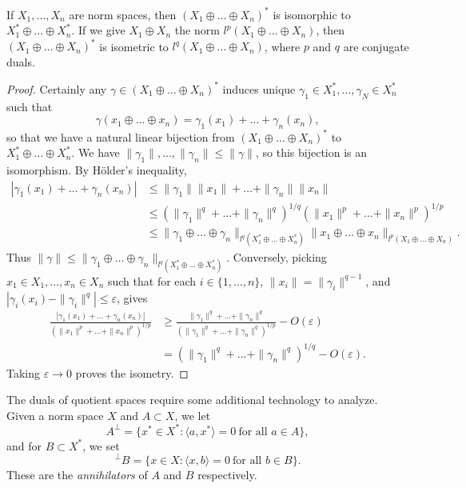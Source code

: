 \begin{theorem}
    If $X_1, \dots, X_n$ are norm spaces, then $(X_1 \oplus \dots \oplus X_n)^*$ is isomorphic to $X_1^* \oplus \dots \oplus X_n^*$. If we give $X_1 \oplus X_n$ the norm $l^p(X_1 \oplus \dots \oplus X_n)$, then $(X_1 \oplus \dots \oplus X_n)^*$ is isometric to $l^q(X_1 \oplus \dots \oplus X_n)$, where $p$ and $q$ are conjugate duals.
\end{theorem}
\begin{proof}
    Certainly any $\gamma \in (X_1 \oplus \dots \oplus X_n)^*$ induces unique $\gamma_1 \in X_1^*, \dots, \gamma_N \in X_n^*$ such that
    \[ \gamma(x_1 \oplus \dots \oplus x_n) = \gamma_1(x_1) + \dots + \gamma_n(x_n), \]
    so that we have a natural linear bijection from $(X_1 \oplus \dots \oplus X_n)^*$ to $X_1^* \oplus \dots \oplus X_n^*$. We have $\| \gamma_1 \|, \dots, \| \gamma_n \| \leq \| \gamma \|$, so this bijection is an isomorphism. By H\"{o}lder's inequality,
    \begin{align*}
        |\gamma_1(x_1) + \dots + \gamma_n(x_n)| &\leq \| \gamma_1 \| \| x_1 \| + \dots + \| \gamma_n \| \| x_n \|\\
        &\leq \left( \| \gamma_1 \|^q + \dots + \| \gamma_n \|^q \right)^{1/q} \left( \| x_1 \|^p + \dots + \| x_n \|^p \right)^{1/p}\\
        &\leq \| \gamma_1 \oplus \dots \oplus \gamma_n \|_{l^q(X_1^* \oplus \dots \oplus X_n^*)} \| x_1 \oplus \dots \oplus x_n \|_{l^p(X_1 \oplus \dots \oplus X_n)}.
    \end{align*}
    Thus $\| \gamma \| \leq \| \gamma_1 \oplus \dots \oplus \gamma_n \|_{l^q(X_1^* \oplus \dots \oplus X_n^*)}$. Conversely, picking $x_1 \in X_1, \dots, x_n \in X_n$ such that for each $i \in \{ 1, \dots, n \}$, $\| x_i \| = \| \gamma_i \|^{q-1}$, and $|\gamma_i(x_i) - \| \gamma_i \|^q| \leq \varepsilon$, gives
    \begin{align*}
        \frac{|\gamma_1(x_1) + \dots + \gamma_n(x_n)|}{\left( \| x_1 \|^p + \dots + \| x_n \|^p \right)^{1/p}} &\geq \frac{\| \gamma_1 \|^q + \dots + \| \gamma_n \|^q}{\left( \| \gamma_1 \|^q + \dots + \| \gamma_n \|^q \right)^{1/p}} - O(\varepsilon)\\
        &= \left( \| \gamma_1 \|^q + \dots + \| \gamma_n \|^q \right)^{1/q} - O(\varepsilon).
    \end{align*}
    Taking $\varepsilon \to 0$ proves the isometry.
\end{proof}

The duals of quotient spaces require some additional technology to analyze. Given a norm space $X$ and $A \subset X$, we let
%
\[ A^\perp = \{ x^* \in X^* : \langle a, x^* \rangle = 0\ \text{for all $a \in A$} \}, \]
%
and for $B \subset X^*$, we set
%
\[ {}^{\perp} B = \{ x \in X: \langle x, b \rangle = 0\ \text{for all $b \in B$} \}. \]
%
These are the \emph{annihilators} of $A$ and $B$ respectively.

